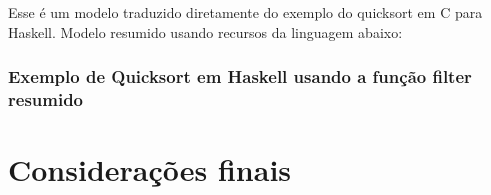\documentclass[
  article,			       %
  12pt,				         %
  oneside,			       %
  a4paper,			       %
  english,		       	 %
  brazil,			      	 %
  sumario=tradicional
]{abntex2}
\begin{document}
      
      
      Esse é um modelo traduzido diretamente do exemplo do quicksort em C para Haskell. Modelo resumido usando recursos da linguagem
      abaixo:

      \subsection{Exemplo de Quicksort em Haskell usando a função filter resumido} 

      

    \newpage

    \chapter{Considerações finais}

    \newpage

    \postextual
\end{document}
